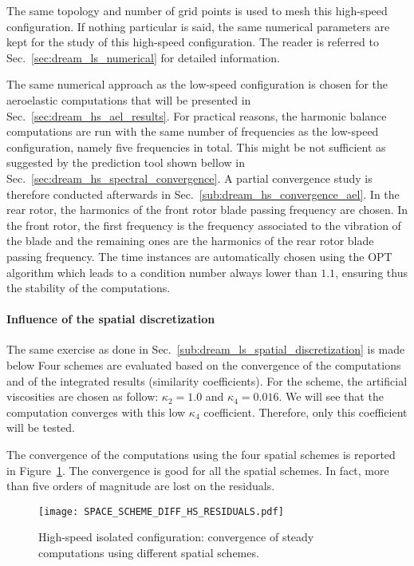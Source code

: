 
The same topology and number of grid points is used to
mesh this high-speed configuration. 
If nothing particular is said, the same numerical parameters
are kept for the study of this
high-speed configuration.
The reader is referred to 
Sec.~\ref{sec:dream_ls_numerical} for detailed information.

The same numerical approach as the low-speed configuration
is chosen for the aeroelastic computations that will
be presented in
Sec.~\ref{sec:dream_hs_ael_results}.
For practical reasons, the harmonic balance computations are run with
the same number of frequencies as the low-speed configuration,
namely five frequencies in total. This might be not sufficient
as suggested by the prediction tool shown bellow in 
Sec.~\ref{sec:dream_hs_spectral_convergence}. A partial 
convergence study is therefore conducted afterwards 
in Sec.~\ref{sub:dream_hs_convergence_ael}.
In the rear rotor,
the harmonics of the front rotor blade passing frequency
are chosen. In the front rotor, the first frequency is the
frequency associated to the vibration of the blade and the
remaining ones are the harmonics of the rear rotor blade 
passing frequency. 
The time instances are automatically chosen using the OPT
algorithm which leads to 
a condition number always lower than $1.1$, ensuring thus
the stability of the computations.

\paragraph{Influence of the spatial discretization}
\label{sub:dream_hs_spatial_discretization}

The same exercise as done in 
Sec.~\ref{sub:dream_ls_spatial_discretization} is made below
Four schemes are evaluated based 
on the convergence of the computations
and of the integrated 
results (similarity coefficients).
For the \citet{Jameson1981} scheme, the artificial viscosities
are chosen as follow: $\kappa_2 = 1.0$
and $\kappa_4 = 0.016$. We will see that the computation converges
with this low $\kappa_4$ coefficient. Therefore, only this coefficient
will be tested.

The convergence of the computations using the four spatial schemes
is reported in Figure~\ref{fig:DREAM_HS_RESIDUALS_PPT}. The convergence is good
for all the spatial schemes. In fact, more than five orders of magnitude
are lost on the residuals.
\begin{figure}[htp]
  \centering
  \texttt{[image: SPACE\_SCHEME\_DIFF\_HS\_RESIDUALS.pdf]}
  \caption{High-speed isolated configuration: convergence 
  of steady computations using different spatial schemes.}
  \label{fig:DREAM_HS_RESIDUALS_PPT}
\end{figure}

